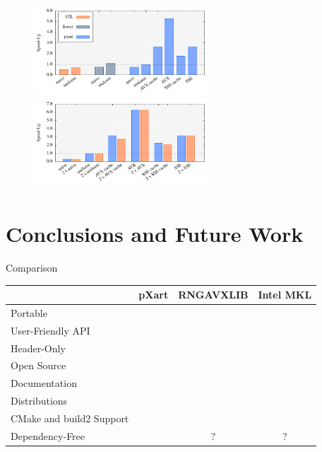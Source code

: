 \documentclass[aspectratio=169]{beamer}
\begin{document}
    \begin{frame}
      \begin{figure}
        \includegraphics[width=0.6\textwidth]{figures/monte_carlo_pi_desktop_mt19937.pdf}\\
        \includegraphics[width=0.6\textwidth]{figures/monte_carlo_pi_desktop_xrsr128p.pdf}
      \end{figure}
    \end{frame}

  \section{Conclusions and Future Work} %
  \label{sec:conclusions}
    \begin{frame}{Comparison}
      \renewcommand{\checkmark}{\ding{52}}
      \newcommand{\crossmark}{\ding{56}}
      \begin{table}
        \begin{tabular}{lccc}
          \hline
          & pXart & RNGAVXLIB & Intel MKL \\
          \hline
          \hline
          Portable & \checkmark & \crossmark & \crossmark \\
          User-Friendly API & \checkmark & \crossmark & \crossmark \\
          Header-Only & \checkmark & \crossmark & \crossmark \\
          Open Source & \checkmark & \checkmark & \crossmark \\
          Documentation & \checkmark & \crossmark & \checkmark \\
          Distributions & \crossmark & \checkmark & \checkmark \\
          CMake and build2 Support & \checkmark & \crossmark & \crossmark \\
          Dependency-Free & \checkmark & ? & ? \\
          \hline
        \end{tabular}
      \end{table}
    \end{frame}
\end{document}
